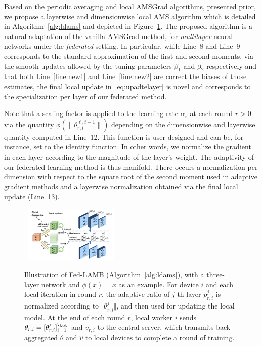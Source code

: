 \documentclass[twoside]{article}
\begin{document}
Based on the periodic averaging and local AMSGrad algorithms, presented prior, we propose a layerwise and dimensionwise local AMS algorithm which is detailed in Algorithm~\ref{alg:ldams} and  depicted in Figure~\ref{fig:illustrate}. The proposed algorithm is a natural adaptation of the vanilla AMSGrad method, for \emph{multilayer} neural networks under the \emph{federated} setting.
In particular, while Line~8 and Line~9 corresponds to the standard approximation of the first and second moments, via the smooth updates allowed by the tuning parameters $\beta_1$ and $\beta_2$ respectively and that both Line~\ref{line:new1} and Line~\ref{line:new2} are correct the biases of those estimates, the final local update in~\eqref{eq:upadtelayer} is novel and corresponds to the specialization per layer of our federated method.


Note that a scaling factor is applied to the learning rate $\alpha_r$ at each round $r>0$ via the quantity $\phi(\|\theta_{r,i}^{\ell,t-1}\|)$ depending on the dimensionwise and layerwise quantity computed in Line~12.
This function is user designed and can be, for instance, set to the identity function. 
In other words, we normalize the gradient in each layer according to the magnitude of the layer's weight.
The adaptivity of our federated learning method is thus manifold. 
There occurs a normalization per dimension with respect to the square root of the second moment used in adaptive gradient methods and a layerwise normalization obtained via the final local update (Line~13).




\begin{figure}[t]
\centering
\mbox{
        \includegraphics[width=0.4\textwidth]{new_figure/plot1.pdf}
}
	\caption{Illustration of Fed-LAMB (Algorithm~\ref{alg:ldams}), with a three-layer network and $\phi(x)=x$ as an example. %
		For device $i$ and each local iteration in round $r$, the adaptive ratio of $j$-th layer $p_{r,i}^j$ is normalized according to $\Vert \theta_{r,i}^j\Vert$, and then used for updating the local model. 
	At the end of each round $r$, local worker $i$ sends $\theta_{r,i} =  [\theta_{r,i}^{\ell}]_{\ell =1}^{\tot}$ and $v_{r,i}$ to the central server, which transmits back aggregated $\theta$ and $\hat v$ to local devices to complete a round of training.}
	\label{fig:illustrate}
\end{figure}
\end{document}
